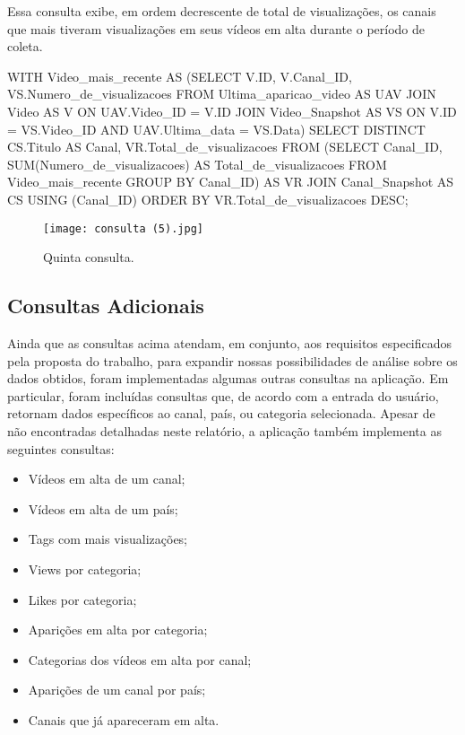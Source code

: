   Essa consulta exibe, em ordem decrescente de total de visualizações, os canais que mais tiveram visualizações em seus vídeos em alta durante o período de coleta.

  \begin{code}
WITH
  Video_mais_recente AS
    (SELECT V.ID, V.Canal_ID, VS.Numero_de_visualizacoes
         FROM Ultima_aparicao_video AS UAV JOIN
          Video AS V ON UAV.Video_ID = V.ID JOIN
            Video_Snapshot AS VS ON V.ID = VS.Video_ID AND
                        UAV.Ultima_data = VS.Data)
SELECT DISTINCT CS.Titulo AS Canal, VR.Total_de_visualizacoes
FROM (SELECT Canal_ID, SUM(Numero_de_visualizacoes) AS Total_de_visualizacoes
    FROM Video_mais_recente
      GROUP BY Canal_ID) AS VR JOIN
    Canal_Snapshot AS CS USING (Canal_ID)
ORDER BY VR.Total_de_visualizacoes DESC;
  \end{code}

  \begin{figure}[H]
    \centering
    \texttt{[image: consulta (5).jpg]}
    \caption{Quinta consulta.}
  \end{figure}

\subsection{Consultas Adicionais}

  Ainda que as consultas acima atendam, em conjunto, aos requisitos especificados pela proposta do trabalho, para expandir nossas
  possibilidades de análise sobre os dados obtidos, foram implementadas algumas outras consultas na aplicação. Em particular,
  foram incluídas consultas que, de acordo com a entrada do usuário, retornam dados específicos ao canal, país, ou categoria
  selecionada. Apesar de não encontradas detalhadas neste relatório, a aplicação  também implementa as seguintes consultas:
  \begin{itemize}
    \item Vídeos em alta de um canal;
    \item Vídeos em alta de um país;
    \item Tags com mais visualizações;
    \item Views por categoria;
    \item Likes por categoria;
    \item Aparições em alta por categoria;
    \item Categorias dos vídeos em alta por canal;
    \item Aparições de um canal por país;
    \item Canais que já apareceram em alta.
  \end{itemize}

